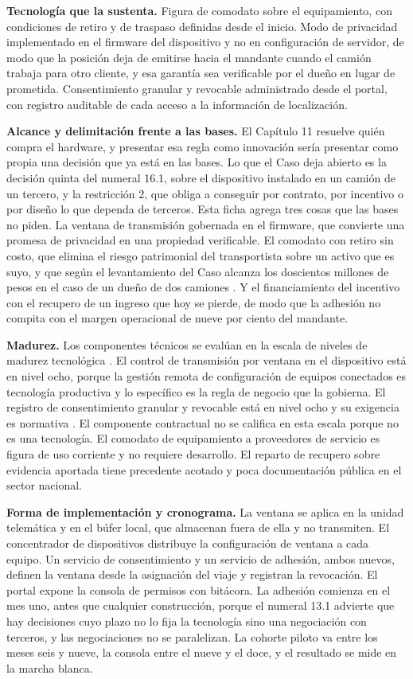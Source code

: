 \textbf{Tecnología que la sustenta.} Figura de comodato sobre el equipamiento, con condiciones de
retiro y de traspaso definidas desde el inicio. Modo de privacidad implementado en el firmware del
dispositivo y no en configuración de servidor, de modo que la posición deja de emitirse hacia el
mandante cuando el camión trabaja para otro cliente, y esa garantía sea verificable por el dueño en
lugar de prometida. Consentimiento granular y revocable administrado desde el portal, con registro
auditable de cada acceso a la información de localización.

\textbf{Alcance y delimitación frente a las bases.} El Capítulo 11 resuelve quién compra el
hardware, y presentar esa regla como innovación sería presentar como propia una decisión que ya
está en las bases. Lo que el Caso deja abierto es la decisión quinta del numeral 16.1, sobre el
dispositivo instalado en un camión de un tercero, y la restricción 2, que obliga a conseguir por
contrato, por incentivo o por diseño lo que dependa de terceros. Esta ficha agrega tres cosas que
las bases no piden. La ventana de transmisión gobernada en el firmware, que convierte una promesa
de privacidad en una propiedad verificable. El comodato con retiro sin costo, que elimina el riesgo
patrimonial del transportista sobre un activo que es suyo, y que según el levantamiento del Caso
alcanza los doscientos millones de pesos en el caso de un dueño de dos camiones
\parencite{bases_caso10_2026}. Y el
financiamiento del incentivo con el recupero de un ingreso que hoy se pierde, de modo que la
adhesión no compita con el margen operacional de nueve por ciento del mandante.

\textbf{Madurez.} Los componentes técnicos se evalúan en la escala de niveles de madurez
tecnológica \parencite{iso16290}. El control de transmisión por ventana en el dispositivo está en
nivel ocho, porque la gestión remota de configuración de equipos conectados es tecnología
productiva y lo específico es la regla de negocio que la gobierna. El registro de consentimiento
granular y revocable está en nivel ocho y su exigencia es normativa \parencite{ley21719}. El
componente contractual no se califica en esta escala porque no es una tecnología. El comodato de
equipamiento a proveedores de servicio es figura de uso corriente y no requiere desarrollo. El
reparto de recupero sobre evidencia aportada tiene precedente acotado y poca documentación pública
en el sector nacional.

\textbf{Forma de implementación y cronograma.} La ventana se aplica en la unidad
telemática y en el búfer local, que almacenan fuera de ella y no transmiten. El concentrador de
dispositivos distribuye la configuración de ventana a cada equipo. Un servicio de consentimiento y
un servicio de adhesión, ambos nuevos, definen la ventana desde la asignación del viaje y registran
la revocación. El portal expone la consola de permisos con bitácora. La adhesión comienza en el mes
uno, antes que cualquier construcción, porque el numeral 13.1 advierte que hay decisiones cuyo
plazo no lo fija la tecnología sino una negociación con terceros, y las negociaciones no se
paralelizan. La cohorte piloto va entre los meses seis y nueve, la consola entre el nueve y el
doce, y el resultado se mide en la marcha blanca.

